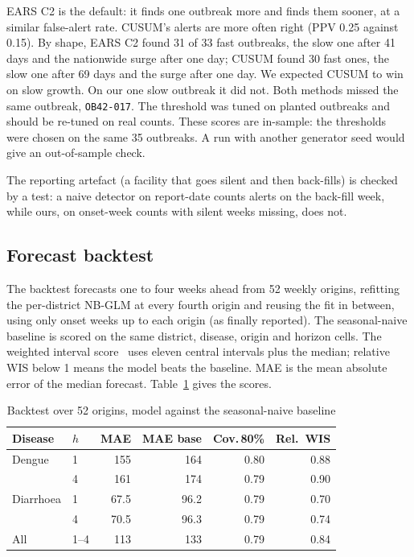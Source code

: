 EARS C2 is the default: it finds one outbreak more and finds them sooner, at a similar false-alert rate. CUSUM's
alerts are more often right (PPV 0.25 against 0.15). By shape, EARS C2 found 31 of 33 fast outbreaks, the slow
one after 41 days and the nationwide surge after one day; CUSUM found 30 fast ones, the slow one after 69 days
and the surge after one day. We expected CUSUM to win on slow growth. On our one slow outbreak it did not.
Both methods missed the same outbreak, \texttt{OB42-017}. The threshold was tuned on planted outbreaks and
should be re-tuned on real counts. These scores are in-sample: the thresholds were chosen on the same 35
outbreaks. A run with another generator seed would give an out-of-sample check.

The reporting artefact (a facility that goes silent and then back-fills) is checked by a test: a naive detector
on report-date counts alerts on the back-fill week, while ours, on onset-week counts with silent weeks missing,
does not.

\subsection{Forecast backtest}
The backtest forecasts one to four weeks ahead from 52 weekly origins, refitting the per-district NB-GLM at every
fourth origin and reusing the fit in between, using only onset weeks up to each origin (as finally reported). The seasonal-naive baseline is scored on
the same district, disease, origin and horizon cells. The weighted interval score~\cite{bracher2021wis}
uses eleven central intervals plus the median; relative WIS below 1 means the model beats the baseline. MAE is
the mean absolute error of the median forecast. Table~\ref{tab:backtest} gives the scores.

\begin{table}[htbp]
\caption{Backtest over 52 origins, model against the seasonal-naive baseline}
\label{tab:backtest}
\centering\small
\setlength{\tabcolsep}{4pt}
\begin{tabular}{@{}llrrrr@{}}
\toprule
Disease & $h$ & MAE & MAE base & Cov.\,80\% & Rel.\ WIS \\
\midrule
Dengue & 1 & 155 & 164 & 0.80 & 0.88 \\
 & 4 & 161 & 174 & 0.79 & 0.90 \\
Diarrhoea & 1 & 67.5 & 96.2 & 0.79 & 0.70 \\
 & 4 & 70.5 & 96.3 & 0.79 & 0.74 \\
\midrule
All & 1--4 & 113 & 133 & 0.79 & 0.84 \\
\bottomrule
\end{tabular}
\end{table}

